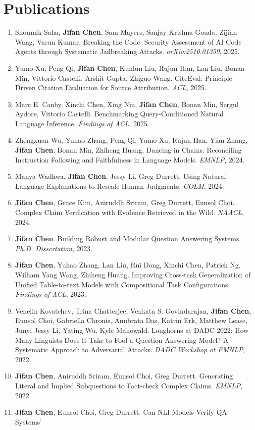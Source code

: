 \documentclass[11pt,letterpaper]{article}
\newcommand{\pub}[1]{\item #1}
\begin{document}
\section{Publications}
{\small
\begin{enumerate}[leftmargin=1.6em,topsep=2pt,itemsep=4pt,parsep=0pt]
  \pub{Shoumik Saha, \textbf{Jifan Chen}, Sam Mayers, Sanjay Krishna Gouda, Zijian Wang,
       Varun Kumar. Breaking the Code: Security Assessment of AI Code Agents through
       Systematic Jailbreaking Attacks. \emph{arXiv:2510.01359}, 2025.}
  \pub{Yumo Xu, Peng Qi, \textbf{Jifan Chen}, Kunlun Liu, Rujun Han, Lan Liu, Bonan Min,
       Vittorio Castelli, Arshit Gupta, Zhiguo Wang. CiteEval: Principle-Driven Citation
       Evaluation for Source Attribution. \emph{ACL}, 2025.}
  \pub{Marc E. Canby, Xinchi Chen, Xing Niu, \textbf{Jifan Chen}, Bonan Min, Sergul Aydore,
       Vittorio Castelli. Benchmarking Query-Conditioned Natural Language Inference.
       \emph{Findings of ACL}, 2025.}
  \pub{Zhengxuan Wu, Yuhao Zhang, Peng Qi, Yumo Xu, Rujun Han, Yian Zhang, \textbf{Jifan Chen},
       Bonan Min, Zhiheng Huang. Dancing in Chains: Reconciling Instruction Following and
       Faithfulness in Language Models. \emph{EMNLP}, 2024.}
  \pub{Manya Wadhwa, \textbf{Jifan Chen}, Jessy Li, Greg Durrett. Using Natural Language
       Explanations to Rescale Human Judgments. \emph{COLM}, 2024.}
  \pub{\textbf{Jifan Chen}, Grace Kim, Aniruddh Sriram, Greg Durrett, Eunsol Choi. Complex
       Claim Verification with Evidence Retrieved in the Wild. \emph{NAACL}, 2024.}
  \pub{\textbf{Jifan Chen}. Building Robust and Modular Question Answering Systems.
       \emph{Ph.D. Dissertation}, 2023.}
  \pub{\textbf{Jifan Chen}, Yuhao Zhang, Lan Liu, Rui Dong, Xinchi Chen, Patrick Ng,
       William Yang Wang, Zhiheng Huang. Improving Cross-task Generalization of Unified
       Table-to-text Models with Compositional Task Configurations. \emph{Findings of ACL}, 2023.}
  \pub{Venelin Kovatchev, Trina Chatterjee, Venkata S. Govindarajan, \textbf{Jifan Chen},
       Eunsol Choi, Gabriella Chronis, Anubrata Das, Katrin Erk, Matthew Lease, Junyi Jessy Li,
       Yating Wu, Kyle Mahowald. Longhorns at DADC 2022: How Many Linguists Does It Take to
       Fool a Question Answering Model? A Systematic Approach to Adversarial Attacks.
       \emph{DADC Workshop at EMNLP}, 2022.}
  \pub{\textbf{Jifan Chen}, Aniruddh Sriram, Eunsol Choi, Greg Durrett. Generating Literal and
       Implied Subquestions to Fact-check Complex Claims. \emph{EMNLP}, 2022.}
  \pub{\textbf{Jifan Chen}, Eunsol Choi, Greg Durrett. Can NLI Models Verify QA Systems'
}
\end{enumerate}}
\end{document}
